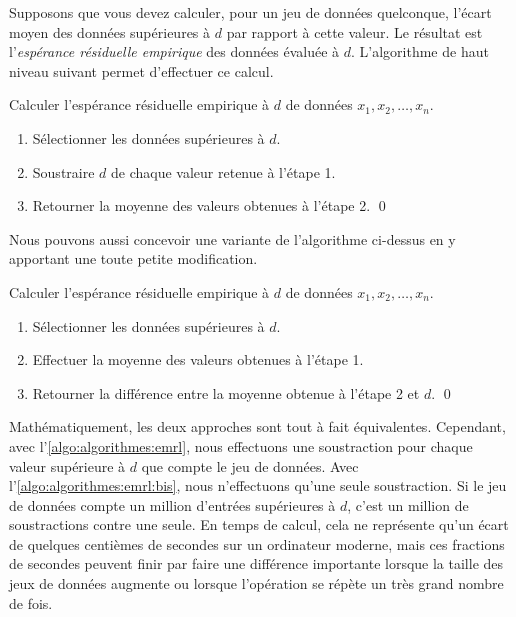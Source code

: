 Supposons que vous devez calculer, pour un jeu de données quelconque,
l'écart moyen des données supérieures à $d$ par rapport à cette
valeur. Le résultat est l'\emph{espérance résiduelle empirique} des
données évaluée à $d$. L'algorithme de haut niveau suivant permet
d'effectuer ce calcul.

\begin{algorithme}
  \label{algo:algorithmes:emrl}
  Calculer l'espérance résiduelle empirique à $d$ de données $x_1, x_2,
  \dots, x_n$.
  \begin{enumerate}
  \item Sélectionner les données supérieures à $d$.
  \item Soustraire $d$ de chaque valeur retenue à l'étape 1.
  \item Retourner la moyenne des valeurs obtenues à l'étape 2.
    \qed
  \end{enumerate}
\end{algorithme}

Nous pouvons aussi concevoir une variante de l'algorithme ci-dessus en
y apportant une toute petite modification.

\begin{algorithmebis}
  \label{algo:algorithmes:emrl:bis}
  Calculer l'espérance résiduelle empirique à $d$ de données $x_1, x_2,
  \dots, x_n$.
  \begin{enumerate}
  \item Sélectionner les données supérieures à $d$.
  \item Effectuer la moyenne des valeurs obtenues à l'étape 1.
  \item Retourner la différence entre la moyenne obtenue à l'étape 2
    et $d$.
    \qed
  \end{enumerate}
\end{algorithmebis}

Mathématiquement, les deux approches sont tout à fait équivalentes.
Cependant, avec l'\autoref{algo:algorithmes:emrl}, nous effectuons une
soustraction pour chaque valeur supérieure à $d$ que compte le jeu de
données. Avec l'\autoref{algo:algorithmes:emrl:bis}, nous n'effectuons
qu'une seule soustraction. Si le jeu de données compte un million
d'entrées supérieures à $d$, c'est un million de soustractions contre
une seule. En temps de calcul, cela ne représente qu'un écart de
quelques centièmes de secondes sur un ordinateur moderne, mais ces
fractions de secondes peuvent finir par faire une différence
importante lorsque la taille des jeux de données augmente ou lorsque
l'opération se répète un très grand nombre de fois.

